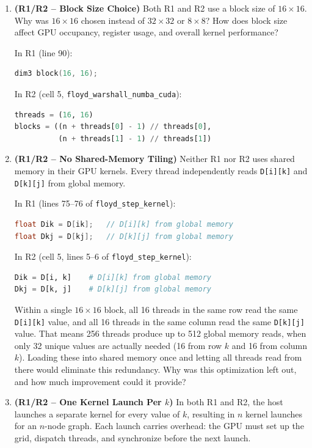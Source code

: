 \documentclass[11pt]{article}
\begin{document}
\begin{enumerate}
  \item \textbf{(R1/R2 -- Block Size Choice)} Both R1 and R2 use a block size of $16 \times 16$. Why was $16 \times 16$ chosen instead of $32 \times 32$ or $8 \times 8$? How does block size affect GPU occupancy, register usage, and overall kernel performance?

  In R1 (line 90):
\begin{lstlisting}[language=C++]
dim3 block(16, 16);
\end{lstlisting}

  In R2 (cell 5, \texttt{floyd\_warshall\_numba\_cuda}):
\begin{lstlisting}[language=Python]
threads = (16, 16)
blocks = ((n + threads[0] - 1) // threads[0],
          (n + threads[1] - 1) // threads[1])
\end{lstlisting}

  \item \textbf{(R1/R2 -- No Shared-Memory Tiling)} Neither R1 nor R2 uses shared memory in their GPU kernels. Every thread independently reads \texttt{D[i][k]} and \texttt{D[k][j]} from global memory.

  In R1 (lines 75--76 of \texttt{floyd\_step\_kernel}):
\begin{lstlisting}[language=C++]
float Dik = D[ik];   // D[i][k] from global memory
float Dkj = D[kj];   // D[k][j] from global memory
\end{lstlisting}

  In R2 (cell 5, lines 5--6 of \texttt{floyd\_step\_kernel}):
\begin{lstlisting}[language=Python]
Dik = D[i, k]    # D[i][k] from global memory
Dkj = D[k, j]    # D[k][j] from global memory
\end{lstlisting}

  Within a single $16 \times 16$ block, all 16 threads in the same row read the same \texttt{D[i][k]} value, and all 16 threads in the same column read the same \texttt{D[k][j]} value. That means 256 threads produce up to 512 global memory reads, when only 32 unique values are actually needed (16 from row $k$ and 16 from column $k$). Loading these into shared memory once and letting all threads read from there would eliminate this redundancy. Why was this optimization left out, and how much improvement could it provide?

  \item \textbf{(R1/R2 -- One Kernel Launch Per $k$)} In both R1 and R2, the host launches a separate kernel for every value of $k$, resulting in $n$ kernel launches for an $n$-node graph. Each launch carries overhead: the GPU must set up the grid, dispatch threads, and synchronize before the next launch.


\end{enumerate}
\end{document}
